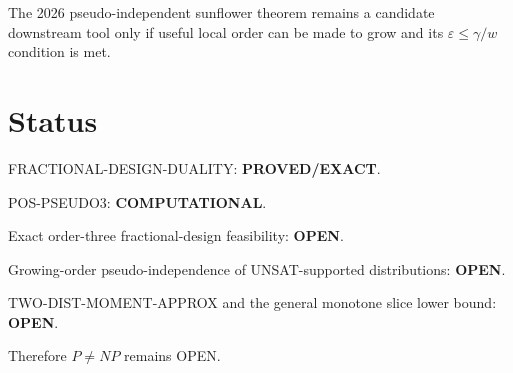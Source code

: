 \documentclass[11pt]{article}
\begin{document}
The 2026 pseudo-independent sunflower theorem remains a candidate downstream
tool only if useful local order can be made to grow and its
\(\varepsilon\le\gamma/w\) condition is met.

\section{Status}

FRACTIONAL-DESIGN-DUALITY: \textbf{PROVED/EXACT}.

POS-PSEUDO3: \textbf{COMPUTATIONAL}.

Exact order-three fractional-design feasibility: \textbf{OPEN}.

Growing-order pseudo-independence of UNSAT-supported distributions:
\textbf{OPEN}.

TWO-DIST-MOMENT-APPROX and the general monotone slice lower bound:
\textbf{OPEN}.

Therefore \(P\ne NP\) remains OPEN.
\end{document}
